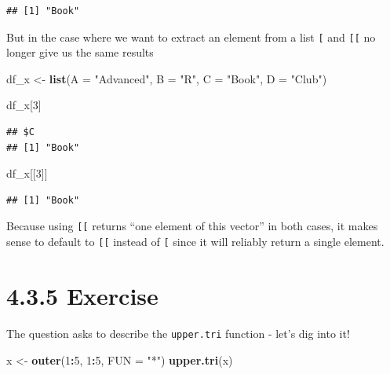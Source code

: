 \documentclass[]{book}
\newenvironment{Shaded}{\begin{snugshade}}{\end{snugshade}}
\newcommand{\DataTypeTok}[1]{\textcolor[rgb]{0.13,0.29,0.53}{#1}}
\newcommand{\DecValTok}[1]{\textcolor[rgb]{0.00,0.00,0.81}{#1}}
\newcommand{\KeywordTok}[1]{\textcolor[rgb]{0.13,0.29,0.53}{\textbf{#1}}}
\newcommand{\NormalTok}[1]{#1}
\newcommand{\OperatorTok}[1]{\textcolor[rgb]{0.81,0.36,0.00}{\textbf{#1}}}
\newcommand{\StringTok}[1]{\textcolor[rgb]{0.31,0.60,0.02}{#1}}
\begin{document}
\begin{verbatim}
## [1] "Book"
\end{verbatim}

But in the case where we want to extract an element from a list \texttt{{[}} and \texttt{{[}{[}} no longer give us the same results

\begin{Shaded}
\begin{Highlighting}[]
\NormalTok{df_x <-}\StringTok{ }\KeywordTok{list}\NormalTok{(}\DataTypeTok{A =} \StringTok{"Advanced"}\NormalTok{, }\DataTypeTok{B =} \StringTok{"R"}\NormalTok{, }\DataTypeTok{C =} \StringTok{"Book"}\NormalTok{, }\DataTypeTok{D =} \StringTok{"Club"}\NormalTok{)}

\NormalTok{df_x[}\DecValTok{3}\NormalTok{]}
\end{Highlighting}
\end{Shaded}

\begin{verbatim}
## $C
## [1] "Book"
\end{verbatim}

\begin{Shaded}
\begin{Highlighting}[]
\NormalTok{df_x[[}\DecValTok{3}\NormalTok{]]}
\end{Highlighting}
\end{Shaded}

\begin{verbatim}
## [1] "Book"
\end{verbatim}

Because using \texttt{{[}{[}} returns ``one element of this vector'' in both cases, it makes sense to default to \texttt{{[}{[}} instead of \texttt{{[}} since it will reliably return a single element.

\hypertarget{exercise_435}{%
\section*{4.3.5 Exercise}\label{exercise_435}}

The question asks to describe the \texttt{upper.tri} function - let's dig into it!

\begin{Shaded}
\begin{Highlighting}[]
\NormalTok{x <-}\StringTok{ }\KeywordTok{outer}\NormalTok{(}\DecValTok{1}\OperatorTok{:}\DecValTok{5}\NormalTok{, }\DecValTok{1}\OperatorTok{:}\DecValTok{5}\NormalTok{, }\DataTypeTok{FUN =} \StringTok{"*"}\NormalTok{)}
\KeywordTok{upper.tri}\NormalTok{(x)}
\end{Highlighting}
\end{Shaded}
\end{document}
